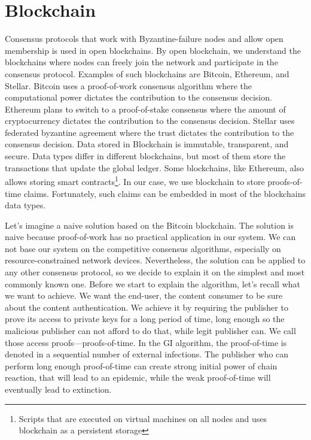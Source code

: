 \documentclass[nostrict]{szablonPG}
\begin{document}
\section{Blockchain}
Consensus protocols that work with Byzantine-failure nodes and allow open membership is used in open blockchains. By open blockchain, we understand the blockchains where nodes can freely join the network and participate in the consensus protocol. Examples of such blockchains are Bitcoin, Ethereum, and Stellar. Bitcoin uses a proof-of-work consensus algorithm where the computational power dictates the contribution to the consensus decision. Ethereum plans to switch to a proof-of-stake consensus where the amount of cryptocurrency dictates the contribution to the consensus decision. Stellar uses federated byzantine agreement where the trust dictates the contribution to the consensus decision. Data stored in Blockchain is immutable, transparent, and secure. Data types differ in different blockchains, but most of them store the transactions that update the global ledger. Some blockchains, like Ethereum, also allows storing smart contracts\footnote{Scripts that are executed on virtual machines on all nodes and uses blockchain as a persistent storage}. In our case, we use blockchain to store proofs-of-time claims. Fortunately, such claims can be embedded in most of the blockchains data types.

Let's imagine a naive solution based on the Bitcoin blockchain. The solution is naive because proof-of-work has no practical application in our system. We can not base our system on the competitive consensus algorithms, especially on resource-constrained network devices. Nevertheless, the solution can be applied to any other consensus protocol, so we decide to explain it on the simplest and most commonly known one. 
Before we start to explain the algorithm, let's recall what we want to achieve. We want the end-user, the content consumer to be sure about the content authentication. We achieve it by requiring the publisher to prove its access to private keys for a long period of time, long enough so the malicious publisher can not afford to do that, while legit publisher can. We call those access proofs––proofs-of-time. In the GI algorithm, the proof-of-time is denoted in a sequential number of external infections. The publisher who can perform long enough proof-of-time can create strong initial power of chain reaction, that will lead to an epidemic, while the weak proof-of-time will eventually lead to extinction. 
\end{document}
